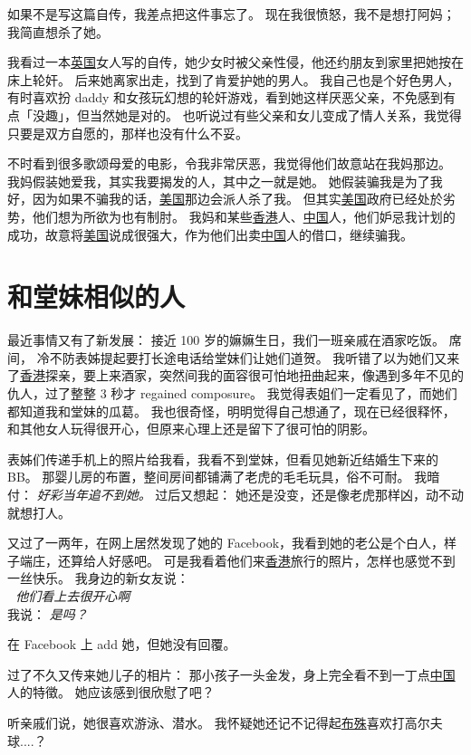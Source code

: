 \documentclass[12pt]{report}
\newcommand{\tab}{\hspace*{1cm}}
\newcommand{\speechCn}[1]{\textrm{\textit{\textcolor{Speech}{#1}}}}
\newcommand*\dashh{\,\,\textemdash\kern-1pt\textemdash\,\,}
\begin{document}
{如果不是写这篇自传，我差点把这件事忘了。  现在我很愤怒，我不是想打阿妈； 我简直想杀了她。 

我看过一本\uline{英国}女人写的自传，她少女时被父亲性侵，他还约朋友到家里把她按在床上轮奸。 后来她离家出走，找到了肯爱护她的男人。 我自己也是个好色男人，有时喜欢扮 daddy 和女孩玩幻想的轮奸游戏，看到她这样厌恶父亲，不免感到有点「没趣」，但当然她是对的。  也听说过有些父亲和女儿变成了情人关系，我觉得只要是双方自愿的，那样也没有什么不妥。

不时看到很多歌颂母爱的电影，令我非常厌恶，我觉得他们故意站在我妈那边。 我妈假装她爱我，其实我要揭发的人，其中之一就是她。  她假装骗我是为了我好，因为如果不骗我的话，\uline{美国}那边会派人杀了我。 但其实\uline{美国}政府已经处於劣势，他们想为所欲为也有制肘。 我妈和某些\uline{香港}人、\uline{中国}人，他们妒忌我计划的成功，故意将\uline{美国}说成很强大，作为他们出卖\uline{中国}人的借口，继续骗我。

\chapter{和堂妹相似的人}

最近事情又有了新发展：  接近 100 岁的嫲嫲生日，我们一班亲戚在酒家吃饭。  席间， 冷不防表姊提起要打长途电话给堂妹们让她们道贺。  我听错了以为她们又来了\uline{香港}探亲，要上来酒家，突然间我的面容很可怕地扭曲起来，像遇到多年不见的仇人，过了整整 3 秒才 regained composure。 我觉得表姐们一定看见了，而她们都知道我和堂妹的瓜葛。  我也很奇怪，明明觉得自己想通了，现在已经很释怀，和其他女人玩得很开心，但原来心理上还是留下了很可怕的阴影。

表姊们传递手机上的照片给我看，我看不到堂妹，但看见她新近结婚生下来的BB。 那婴儿房的布置，整间房间都铺满了老虎的毛毛玩具，俗不可耐。 我暗付： \speechCn{好彩当年追不到她。}  过后又想起： 她还是没变，还是像老虎那样凶，动不动就想打人。

又过了一两年，在网上居然发现了她的 Facebook，我看到她的老公是个白人，样子端庄，还算给人好感吧。 可是我看着他们来\uline{香港}旅行的照片，怎样也感觉不到一丝快乐。 我身边的新女友说：\\
\tab \dashh \speechCn{他们看上去很开心啊} \\
\tab 我说： \speechCn{是吗？}

在 Facebook 上 add 她，但她没有回覆。

过了不久又传来她儿子的相片： 那小孩子一头金发，身上完全看不到一丁点\uline{中国}人的特徵。 她应该感到很欣慰了吧？

听亲戚们说，她很喜欢游泳、潜水。  我怀疑她还记不记得起\uline{布殊}喜欢打高尔夫球....？

}
\end{document}

